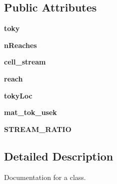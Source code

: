 \subsection*{Public Attributes}
\begin{DoxyCompactItemize}
\item 
\hypertarget{classmain__src_1_1main__classes_1_1Stream_1_1Stream_a8b0a95be0f6f86b3e0be411ef16ab212}{{\bfseries toky}}\label{classmain__src_1_1main__classes_1_1Stream_1_1Stream_a8b0a95be0f6f86b3e0be411ef16ab212}

\item 
\hypertarget{classmain__src_1_1main__classes_1_1Stream_1_1Stream_a98083cf8171a42b4c92e70742371bbca}{{\bfseries n\-Reaches}}\label{classmain__src_1_1main__classes_1_1Stream_1_1Stream_a98083cf8171a42b4c92e70742371bbca}

\item 
\hypertarget{classmain__src_1_1main__classes_1_1Stream_1_1Stream_a859d107c2c9c0abe98f8718a852501b5}{{\bfseries cell\-\_\-stream}}\label{classmain__src_1_1main__classes_1_1Stream_1_1Stream_a859d107c2c9c0abe98f8718a852501b5}

\item 
\hypertarget{classmain__src_1_1main__classes_1_1Stream_1_1Stream_a5319b9c1b27098f1345cb94796c3de09}{{\bfseries reach}}\label{classmain__src_1_1main__classes_1_1Stream_1_1Stream_a5319b9c1b27098f1345cb94796c3de09}

\item 
\hypertarget{classmain__src_1_1main__classes_1_1Stream_1_1Stream_aa10026e2d7185216c990d4bb7014ee37}{{\bfseries toky\-Loc}}\label{classmain__src_1_1main__classes_1_1Stream_1_1Stream_aa10026e2d7185216c990d4bb7014ee37}

\item 
\hypertarget{classmain__src_1_1main__classes_1_1Stream_1_1Stream_a17f9a0ddb6892ddbb8bf2dc11038726b}{{\bfseries mat\-\_\-tok\-\_\-usek}}\label{classmain__src_1_1main__classes_1_1Stream_1_1Stream_a17f9a0ddb6892ddbb8bf2dc11038726b}

\item 
\hypertarget{classmain__src_1_1main__classes_1_1Stream_1_1Stream_ab7e773165fbd820665518f46cfd1d9d5}{{\bfseries S\-T\-R\-E\-A\-M\-\_\-\-R\-A\-T\-I\-O}}\label{classmain__src_1_1main__classes_1_1Stream_1_1Stream_ab7e773165fbd820665518f46cfd1d9d5}

\end{DoxyCompactItemize}


\subsection{Detailed Description}
Documentation for a class. 

